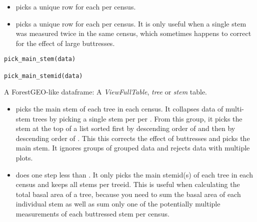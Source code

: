 \documentclass[a4paper]{book}
\begin{document}
%
\begin{Description}\relax
\begin{itemize}

\item {} picks a unique row for each  per census.
\item {} picks a unique row for each  per census. It is
only useful when a single stem was measured twice in the same census, which
sometimes happens to correct for the effect of large buttresses.

\end{itemize}

\end{Description}
%
\begin{Usage}
\begin{verbatim}
pick_main_stem(data)

pick_main_stemid(data)
\end{verbatim}
\end{Usage}
%
\begin{Arguments}
\begin{ldescription}
\item[\code{data}] A ForestGEO-like dataframe: A \emph{ViewFullTable}, \emph{tree} or \emph{stem}
table.
\end{ldescription}
\end{Arguments}
%
\begin{Details}\relax
\begin{itemize}

\item {} picks the main stem of each tree in each census. It
collapses data of multi-stem trees by picking a single stem per  per
. From this group, it picks the stem at the top of a list sorted
first by descending order of  and then by descending order of .
This this corrects the effect of buttresses and picks the main stem. It
ignores groups of grouped data and rejects data with multiple plots.
\item {} does one step less than . It only
picks the main stemid(s) of each tree in each census and keeps all stems per
treeid. This is useful when calculating the total basal area of a tree,
because you need to sum the basal area of each individual stem as well as sum
only one of the potentially multiple measurements of each buttressed stem per
census.

\end{itemize}

\end{Details}
\end{document}
